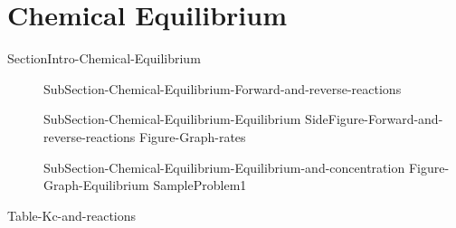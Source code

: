 \documentclass[main.tex]{subfiles}
\begin{document}
\section{Chemical Equilibrium} {SectionIntro-Chemical-Equilibrium}
\sloppy\begin{description}
\item[] {SubSection-Chemical-Equilibrium-Forward-and-reverse-reactions}
\item[] {SubSection-Chemical-Equilibrium-Equilibrium}
{SideFigure-Forward-and-reverse-reactions}
{Figure-Graph-rates}
\item[] {SubSection-Chemical-Equilibrium-Equilibrium-and-concentration}
{Figure-Graph-Equilibrium}
{SampleProblem1}
\end{description}


{Table-Kc-and-reactions}
\end{document}
